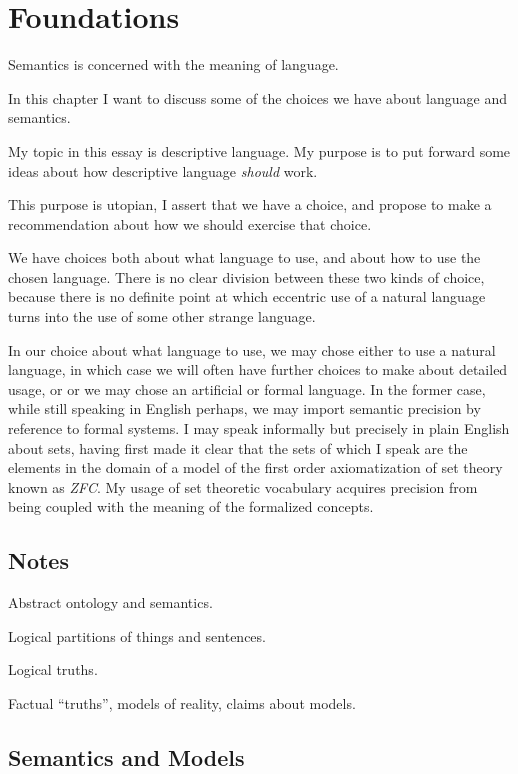 \chapter{Foundations}\label{Foundations}

Semantics is concerned with the meaning of language.

In this chapter I want to discuss some of the choices we have about language and semantics.

My topic in this essay is descriptive language.
My purpose is to put forward some ideas about how descriptive language {\it should} work.

This purpose is utopian, I assert that we have a choice, and propose to make a recommendation about how we should exercise that choice.

We have choices both about what language to use, and about how to use the chosen language.
There is no clear division between these two kinds of choice, because there is no definite point at which eccentric use of a natural language turns into the use of some other strange language.

In our choice about what language to use, we may chose either to use a natural language, in which case we will often have further choices to make about detailed usage, or or we may chose an artificial or formal language.
In the former case, while still speaking in English perhaps, we may import semantic precision by reference to formal systems.
I may speak informally but precisely in plain English about sets, having first made it clear that the sets of which I speak are the elements in the domain of a model of the first order axiomatization of set theory known as {\it ZFC}.
My usage of set theoretic vocabulary acquires precision from being coupled with the meaning of the formalized concepts. 

\section{Notes}

Abstract ontology and semantics.

Logical partitions of things and sentences.

Logical truths.

Factual ``truths'', models of reality, claims about models.


\section{Semantics and Models}

